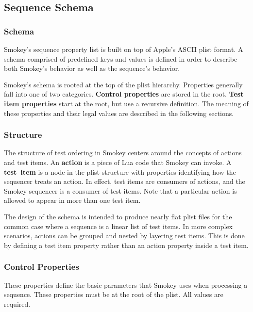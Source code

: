 \documentclass[11pt]{article}
\newcommand{\jargon}[1]{{\bfseries#1}}
\begin{document}
\subsection{Sequence Schema}

\subsubsection{Schema}

Smokey's sequence property list is built on top of Apple's ASCII plist format.
A schema comprised of predefined keys and values is defined in order to
describe both Smokey's behavior as well as the sequence's behavior.

Smokey's schema is rooted at the top of the plist hierarchy.  Properties
generally fall into one of two categories.  \jargon{Control properties} are stored in
the root.  \jargon{Test item properties} start at the root, but use a recursive
definition.  The meaning of these properties and their legal values are
described in the following sections.


\subsubsection{Structure}

The structure of test ordering in Smokey centers around the concepts of actions
and test items.  An \jargon{action} is a piece of Lua code that Smokey can invoke.  A
\jargon{test item} is a node in the plist structure with properties identifying how the
sequencer treats an action.  In effect, test items are consumers of actions,
and the Smokey sequencer is a consumer of test items.  Note that a particular
action is allowed to appear in more than one test item.

The design of the schema is intended to produce nearly flat plist files for the
common case where a sequence is a linear list of test items.  In more complex
scenarios, actions can be grouped and nested by layering test items.  This is
done by defining a test item property rather than an action property inside a
test item.

\subsubsection{Control Properties}

These properties define the basic parameters that Smokey uses when processing a
sequence.  These properties must be at the root of the plist.  All values are
required.
\end{document}
